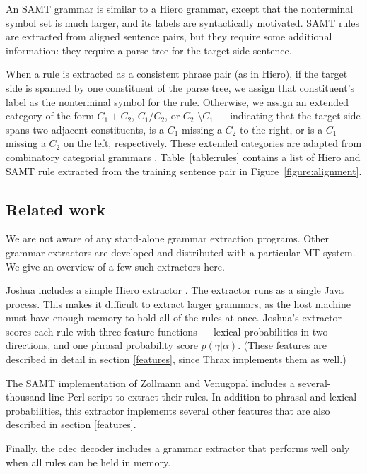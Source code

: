 \documentclass[11pt]{article}
\begin{document}
An SAMT grammar \cite{samt2006} is similar to a Hiero grammar, except
that the nonterminal symbol set is much larger, and its labels are
syntactically motivated.  SAMT rules are extracted from aligned sentence pairs, but they require some additional information: they require a parse tree for the target-side sentence.

When a rule is extracted as a consistent phrase pair (as in Hiero), if
the target side is spanned by one constituent of the parse tree, we
assign that constituent's label as the nonterminal symbol for the
rule.  Otherwise, we assign an extended category of the form
$C_1+C_2$, $C_1 / C_2$, or $C_2$ \textbackslash $C_1$ --- indicating
that the target side spans two adjacent constituents, is a $C_1$
missing a $C_2$ to the right, or is a $C_1$ missing a $C_2$ on the
left, respectively.  These extended categories are adapted from
combinatory categorial grammars \cite{Steedman1999}.
Table~\ref{table:rules} contains a list of Hiero and SAMT rule
extracted from the training sentence pair in Figure~\ref{figure:alignment}.

\subsection{Related work}

We are not aware of any stand-alone grammar extraction programs. Other grammar extractors are developed and distributed with a particular MT system. We give an overview of a few such extractors here.

Joshua includes a simple Hiero extractor \cite{schwartz2010}. The extractor runs as a single Java process. This makes it difficult to extract larger grammars, as the host machine must have enough memory to hold all of the rules at once. Joshua's extractor scores each rule with three feature functions --- lexical probabilities in two directions, and one phrasal probability score $p(\gamma|\alpha)$. (These features are described in detail in section \ref{features}, since Thrax implements them as well.) 

The SAMT implementation of Zollmann and Venugopal  includes a several-thousand-line Perl script to extract their rules. In addition to phrasal and lexical probabilities, this extractor implements several other features that are also described in section \ref{features}.

Finally, the cdec decoder \cite {cdec} includes a grammar extractor that performs well only when all rules can be held in memory.
\end{document}
